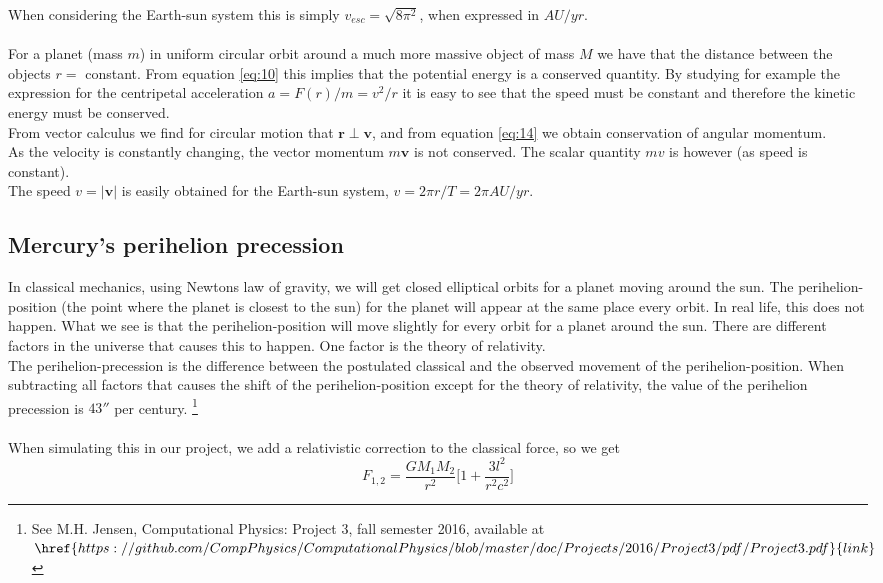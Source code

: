 \documentclass[%
 reprint,
 nobalance,
 amsmath,amssymb,
 aps,
]{revtex4-1}
\begin{document}
When considering the Earth-sun system this is simply $v_{esc} = \sqrt{8\pi^{2}}$, when expressed in $AU/yr$. \\ \\
For a planet (mass $m$) in uniform circular orbit around a much more massive object of mass $M$ we have that the distance between the objects $r = $ constant. From equation \eqref{eq:10} this implies that the potential energy is a conserved quantity. By studying for example the expression for the centripetal acceleration $a = F(r)/m = v^{2}/r$ it is easy to see that the speed must be constant and therefore the kinetic energy must be conserved.\\
From vector calculus we find for circular motion that $\bm{r} \perp \bm{v}$, and from equation \eqref{eq:14} we obtain conservation of angular momentum.\\
As the velocity is constantly changing, the vector momentum $m\bm{v}$ is not conserved. The scalar quantity $mv$ is however (as speed is constant).\\
The speed $v = \left|\bm{v} \right|$ is easily obtained for the Earth-sun system, $v = 2\pi r/T = 2\pi AU/yr$.

\subsection{\label{sec:Thi} Mercury's perihelion precession}

In classical mechanics, using Newtons law of gravity, we will get closed elliptical orbits for a planet moving around the sun. The perihelion-position (the point where the planet is closest to the sun) for the planet will appear at the same place every orbit. In real life, this does not happen. What we see is that the perihelion-position will move slightly for every orbit for a planet around the sun. There are different factors in the universe that causes this to happen. One factor is the theory of relativity. \\
The perihelion-precession is the difference between the postulated classical and the observed movement of the perihelion-position. When subtracting all factors that causes the shift of the perihelion-position except for the theory of relativity, the value of the perihelion precession is $43''$ per century. \footnote{See M.H. Jensen, Computational Physics: Project 3, fall semester 2016, available at $\href{https://github.com/CompPhysics/ComputationalPhysics/blob/master/doc/Projects/2016/Project3/pdf/Project3.pdf}{link}$}
\\\\
When simulating this in our project, we add a relativistic correction to the classical force, so we get
\begin{equation}\label{eq:force_relCorr}
F_{1,2} = \frac{GM_1M_2}{r^2}\bigg[ 1 + \frac{3l^2}{r^2c^2}\bigg]
\end{equation}
\end{document}
